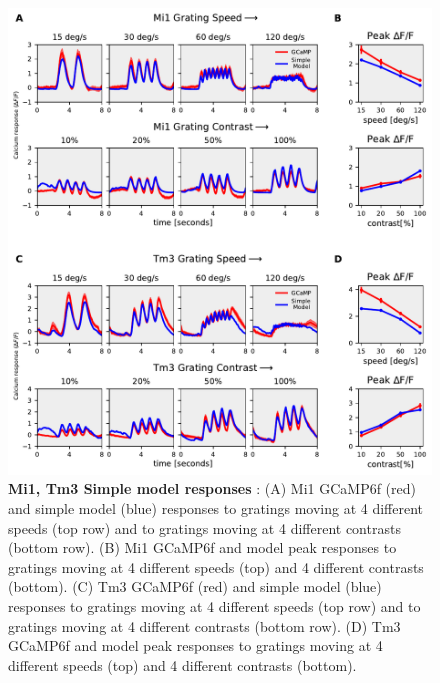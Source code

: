 \documentclass[9pt,lineno]{elife}
\begin{document}
\begin{figure}
\begin{fullwidth}
\includegraphics[width=0.84\linewidth]{figure8}
\caption{\textbf{Mi1, Tm3 Simple model responses} : (A) Mi1 GCaMP6f (red) and simple model (blue) responses to gratings moving at 4 different speeds (top row) and to gratings moving at 4 different contrasts (bottom row). (B) Mi1 GCaMP6f and model peak responses to gratings moving at 4 different speeds (top) and 4 different contrasts (bottom). (C) Tm3 GCaMP6f (red) and simple model (blue) responses to gratings moving at 4 different speeds (top row) and to gratings moving at 4 different contrasts (bottom row). (D) Tm3 GCaMP6f and model peak responses to gratings moving at 4 different speeds (top) and 4 different contrasts (bottom).}

\label{Mi1Tm3model}
	
\end{fullwidth}
\end{figure} 
\end{document}
